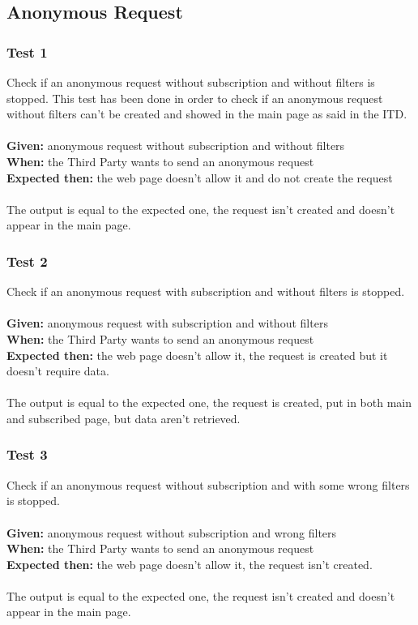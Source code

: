 \subsection{Anonymous Request}

\subsubsection{\Large{Test 1}}
Check if an anonymous request without subscription and without filters is stopped. This test has been done in order to check if an anonymous request without filters can't be created and showed in the main page as  said in the ITD.\\
\\
\textbf{Given: } anonymous request without subscription and without filters\\
\textbf{When: } the Third Party wants to send an anonymous request\\
\textbf{Expected then: } the web page doesn't allow it and do not create the request\\
\\
The output is equal to the expected one, the request isn't created and doesn't appear in the main page.

\subsubsection{\Large{Test 2}}
Check if an anonymous request with subscription and without filters is stopped.\\
\\
\textbf{Given: } anonymous request with subscription and without filters\\
\textbf{When: } the Third Party wants to send an anonymous request\\
\textbf{Expected then: } the web page doesn't allow it, the request is created but it doesn't require data.\\
\\
The output is equal to the expected one, the request is created, put in both main and subscribed page, but data aren't retrieved.

\subsubsection{\Large{Test 3}}
Check if an anonymous request without subscription and with some wrong filters is stopped.\\
\\
\textbf{Given: } anonymous request without subscription and wrong filters\\
\textbf{When: } the Third Party wants to send an anonymous request\\
\textbf{Expected then: } the web page doesn't allow it, the request isn't created.\\
\\
The output is equal to the expected one, the request isn't created and doesn't appear in the main page.


